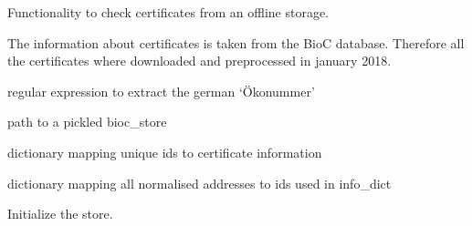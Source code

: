 \documentclass[letterpaper,10pt,english]{sphinxmanual}
\begin{document}
\begin{fulllineitems}
\label{\detokenize{api:bioc.BiocStore}}
Functionality to check certificates from an offline storage.

The information about certificates is taken from the BioC
database. Therefore all the certificates where downloaded and
preprocessed in january 2018.

\begin{fulllineitems}
\label{\detokenize{api:bioc.BiocStore.oeko_re}}
regular expression to extract the german ‘Ökonummer’

\end{fulllineitems}


\begin{fulllineitems}
\label{\detokenize{api:bioc.BiocStore.filename}}
path to a pickled bioc\_store

\end{fulllineitems}


\begin{fulllineitems}
\label{\detokenize{api:bioc.BiocStore.info_dict}}
dictionary mapping unique ids to certificate
information

\end{fulllineitems}


\begin{fulllineitems}
\label{\detokenize{api:bioc.BiocStore.mapping}}
dictionary mapping all normalised addresses to ids used
in info\_dict

\end{fulllineitems}


\begin{fulllineitems}
\label{\detokenize{api:bioc.BiocStore.__init__}}
Initialize the store.


\end{fulllineitems}
\end{fulllineitems}
\end{document}
